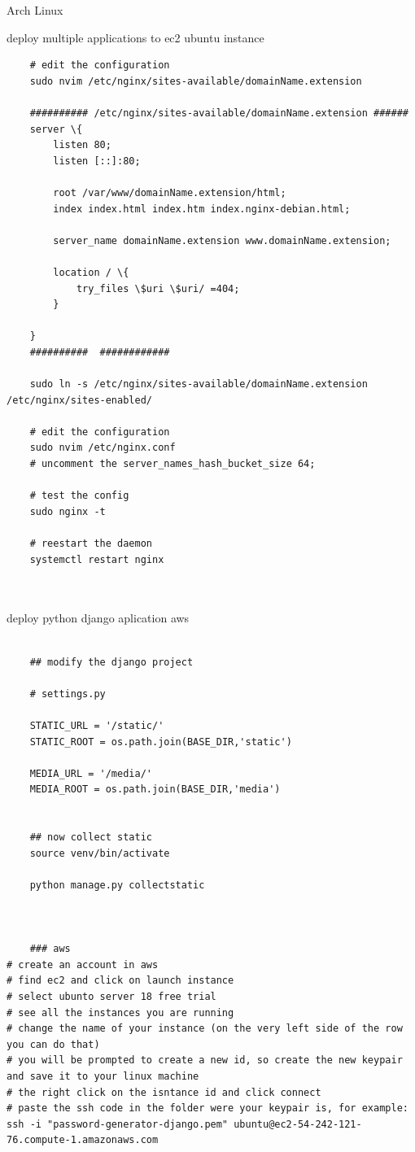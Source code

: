 \begin{section}{Arch Linux}
\begin{section}{deploy multiple applications to ec2 ubuntu instance}
\begin{verbatim}
	# edit the configuration
	sudo nvim /etc/nginx/sites-available/domainName.extension

	########## /etc/nginx/sites-available/domainName.extension ######
	server \{
		listen 80;
		listen [::]:80;

		root /var/www/domainName.extension/html;
		index index.html index.htm index.nginx-debian.html;

		server_name domainName.extension www.domainName.extension;

		location / \{
			try_files \$uri \$uri/ =404;
		}

	}
	##########  ############

	sudo ln -s /etc/nginx/sites-available/domainName.extension /etc/nginx/sites-enabled/ 
	
	# edit the configuration
	sudo nvim /etc/nginx.conf
	# uncomment the server_names_hash_bucket_size 64;
	
	# test the config
	sudo nginx -t
	
	# reestart the daemon
	systemctl restart nginx



	\end{verbatim}

\end{section}
\begin{subsection}{deploy python django aplication aws}
\begin{verbatim}

	## modify the django project

	# settings.py

	STATIC_URL = '/static/'
	STATIC_ROOT = os.path.join(BASE_DIR,'static')

	MEDIA_URL = '/media/'
	MEDIA_ROOT = os.path.join(BASE_DIR,'media')


	## now collect static
	source venv/bin/activate

	python manage.py collectstatic



	### aws
# create an account in aws
# find ec2 and click on launch instance
# select ubunto server 18 free trial
# see all the instances you are running
# change the name of your instance (on the very left side of the row you can do that)
# you will be prompted to create a new id, so create the new keypair and save it to your linux machine
# the right click on the isntance id and click connect
# paste the ssh code in the folder were your keypair is, for example:
ssh -i "password-generator-django.pem" ubuntu@ec2-54-242-121-76.compute-1.amazonaws.com


\end{verbatim}
\end{subsection}
\end{section}

